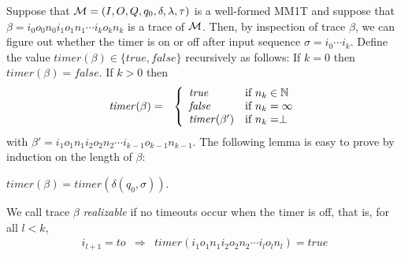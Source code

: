 Suppose that ${\cal M} = (I, O, Q, q_0, \delta, \lambda, \tau)$ is a well-formed MM1T and suppose that
$\beta = i_0 o_0 n_0 i_1 o_1 n_1 \cdots i_k o_k n_k$ is a trace of ${\cal M}$.
Then, by inspection of trace $\beta$, we can figure out whether the timer is on or off
after input sequence $\sigma = i_0 \cdots i_k$.
Define the value $\mathit{timer}(\beta) \in \{ \mathit{true}, \mathit{false} \}$ recursively as follows:
If $k=0$ then $\mathit{timer}(\beta) = \mathit{false}$. If $k > 0$ then
\begin{eqnarray*}
\mathit{timer}(\beta) & = & \left\{ \begin{array}{ll} 
\mathit{true} & \mbox{if } n_k \in{\mathbb N}\\
\mathit{false} & \mbox{if } n_k = \infty\\
\mathit{timer}(\beta') & \mbox{if } n_k = \perp
\end{array}\right.
\end{eqnarray*}
with $\beta' = i_1 o_1 n_1 i_2 o_2 n_2 \cdots i_{k-1} o_{k-1} n_{k-1}$.
%
The following lemma is easy to prove by induction on the length of $\beta$:
\begin{lemma}
\label{timer lemma}
$\mathit{timer}(\beta) = \mathit{timer}(\delta(q_0, \sigma))$.
\end{lemma}

We call trace $\beta$ \emph{realizable} if no timeouts occur when the timer is off, that is,
for all $l < k$,
\begin{eqnarray*}
i_{l+1} = \mathit{to} & \Rightarrow & \mathit{timer} (i_1 o_1 n_1 i_2 o_2 n_2 \cdots i_l o_l n_l) = \mathit{true}
\end{eqnarray*}

